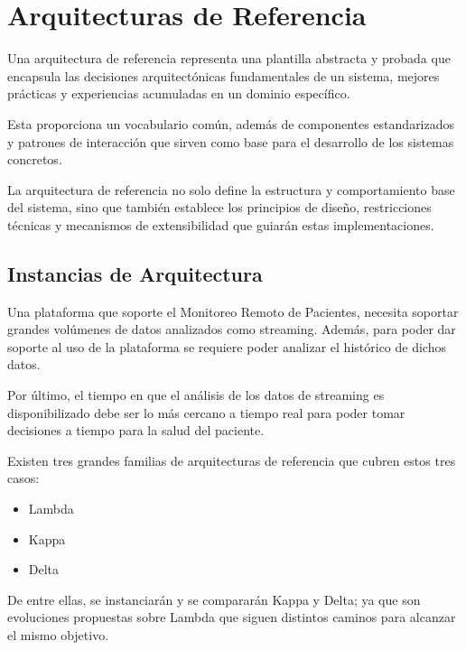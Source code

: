 \section{Arquitecturas de Referencia}

Una arquitectura de referencia representa una plantilla abstracta y probada que encapsula las decisiones arquitectónicas fundamentales de un sistema, 
mejores prácticas y experiencias acumuladas en un dominio específico. \newline

Esta proporciona un vocabulario común, además de componentes estandarizados y patrones de interacción que sirven como base para el desarrollo de los sistemas concretos. \newline

La arquitectura de referencia no solo define la estructura y comportamiento base del sistema, sino que también establece los principios de diseño, 
restricciones técnicas y mecanismos de extensibilidad que guiarán estas implementaciones.
\newpage

\subsection{Instancias de Arquitectura}

Una plataforma que soporte el Monitoreo Remoto de Pacientes, necesita soportar grandes volúmenes de datos analizados como streaming.
Además, para poder dar soporte al uso de la plataforma se requiere poder analizar el histórico de dichos datos. \newline

Por último, el tiempo en que el análisis de los datos de streaming es disponibilizado debe ser lo más cercano a tiempo real para poder tomar 
decisiones a tiempo para la salud del paciente. \newline

Existen tres grandes familias de arquitecturas de referencia que cubren estos tres casos: 
\begin{itemize}
    \item Lambda
    \item Kappa
    \item Delta
\end{itemize}

De entre ellas, se instanciarán y se compararán Kappa y Delta; ya que son evoluciones propuestas sobre Lambda que siguen distintos caminos para alcanzar el mismo objetivo. \newline
 
